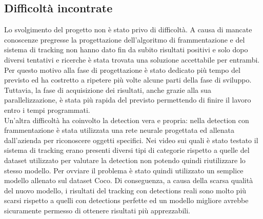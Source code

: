 \subsection{Difficoltà incontrate}
Lo svolgimento del progetto non è stato privo di difficoltà. A causa di mancate conoscenze pregresse la progettazione dell'algoritmo di frammentazione e del sistema di tracking non hanno dato fin da subito risultati positivi e solo dopo diversi tentativi e ricerche è stata trovata una soluzione accettabile per entrambi. Per questo motivo alla fase di progettazione è stato dedicato più tempo del previsto ed ha costretto a ripetere più volte alcune parti della fase di sviluppo. Tuttavia, la fase di acquisizione dei risultati, anche grazie alla sua parallelizzazione, è stata più rapida del previsto permettendo di finire il lavoro entro i tempi programmati.\\
Un'altra difficoltà ha coinvolto la detection vera e propria: nella detection con frammentazione è stata utilizzata una rete neurale progettata ed allenata dall'azienda per riconoscere oggetti specifici. Nei video sui quali è stato testato il sistema di tracking erano presenti diversi tipi di categorie rispetto a quelle del dataset utilizzato per valutare la detection non potendo quindi riutilizzare lo stesso modello. Per ovviare il problema è stato quindi utilizzato un semplice modello allenato sul dataset Coco. Di conseguenza, a causa della scarsa qualità del nuovo modello, i risultati del tracking con detections reali sono molto più scarsi rispetto a quelli con detections perfette ed un modello migliore avrebbe sicuramente permesso di ottenere risultati più apprezzabili. 